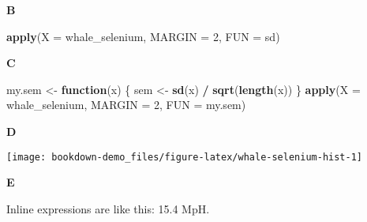 \documentclass[]{book}
\newenvironment{Shaded}{\begin{snugshade}}{\end{snugshade}}
\newcommand{\ControlFlowTok}[1]{\textcolor[rgb]{0.13,0.29,0.53}{\textbf{#1}}}
\newcommand{\DataTypeTok}[1]{\textcolor[rgb]{0.13,0.29,0.53}{#1}}
\newcommand{\DecValTok}[1]{\textcolor[rgb]{0.00,0.00,0.81}{#1}}
\newcommand{\KeywordTok}[1]{\textcolor[rgb]{0.13,0.29,0.53}{\textbf{#1}}}
\newcommand{\NormalTok}[1]{#1}
\newcommand{\OperatorTok}[1]{\textcolor[rgb]{0.81,0.36,0.00}{\textbf{#1}}}
\newcommand{\StringTok}[1]{\textcolor[rgb]{0.31,0.60,0.02}{#1}}
\begin{document}
\textbf{B}

\begin{Shaded}
\begin{Highlighting}[]
\KeywordTok{apply}\NormalTok{(}\DataTypeTok{X =}\NormalTok{ whale_selenium, }\DataTypeTok{MARGIN =} \DecValTok{2}\NormalTok{, }\DataTypeTok{FUN =}\NormalTok{ sd)}
\end{Highlighting}
\end{Shaded}

\textbf{C}

\begin{Shaded}
\begin{Highlighting}[]
\NormalTok{my.sem <-}\StringTok{ }\ControlFlowTok{function}\NormalTok{(x) \{}
\NormalTok{        sem <-}\StringTok{ }\KeywordTok{sd}\NormalTok{(x) }\OperatorTok{/}\StringTok{ }\KeywordTok{sqrt}\NormalTok{(}\KeywordTok{length}\NormalTok{(x))}
\NormalTok{\}}
\KeywordTok{apply}\NormalTok{(}\DataTypeTok{X =}\NormalTok{ whale_selenium, }\DataTypeTok{MARGIN =} \DecValTok{2}\NormalTok{, }\DataTypeTok{FUN =}\NormalTok{ my.sem)}
\end{Highlighting}
\end{Shaded}

\textbf{D}

\begin{Shaded}
\end{Shaded}

\begin{center}\texttt{[image: bookdown-demo\_files/figure-latex/whale-selenium-hist-1]} \end{center}

\textbf{E}

Inline expressions are like this: 15.4 MpH.
\end{document}
